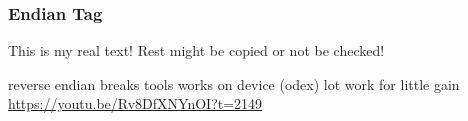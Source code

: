 \subsubsection{Endian Tag} \label{subsubsection:counter-reengineering-break-endian}
This is my real text! Rest might be copied or not be checked!


reverse endian\newline
breaks tools works on device (odex)\newline
lot work for little gain\newline
\url{https://youtu.be/Rv8DfXNYnOI?t=2149}
